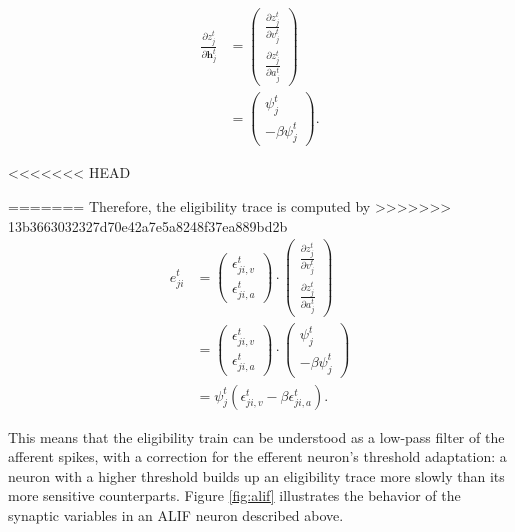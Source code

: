             \begin{align}
                \frac{\partial z^t_j}{\partial\mathbf{h}^t_j} &= \begin{pmatrix}
                    \frac{\partial z^t_j}{\partial v^t_j}\\
                    \frac{\partial z^t_j}{\partial a^t_j}
                    \end{pmatrix}\\
                &= \begin{pmatrix}
                    \psi^t_j\\
                    -\beta\psi^t_j
                    \end{pmatrix}.
            \end{align}

<<<<<<< HEAD

=======
            Therefore, the eligibility trace is computed by
>>>>>>> 13b3663032327d70e42a7e5a8248f37ea889bd2b
            \begin{align}
               e^t_{ji} &= \begin{pmatrix}
            \epsilon_{ji, v}^t\\
            \epsilon_{ji, a}^t
            \end{pmatrix}\cdot \begin{pmatrix}
                    \frac{\partial z^t_j}{\partial v^t_j}\\
                    \frac{\partial z^t_j}{\partial a^t_j}
                    \end{pmatrix}\\
                &= \begin{pmatrix}
            \epsilon_{ji, v}^t\\
            \epsilon_{ji, a}^t
            \end{pmatrix}\cdot \begin{pmatrix}
                    \psi^t_j\\
                    -\beta\psi^t_j
                    \end{pmatrix}\\
                    &= \psi^t_j\left(\epsilon_{ji, v}^t - \beta\epsilon_{ji, a}^t\right).
            \end{align}


            This means that the eligibility train can be understood as a low-pass filter of the afferent spikes, with a correction for the efferent neuron's threshold adaptation: a neuron with a higher threshold builds up an eligibility trace more slowly than its more sensitive counterparts.
            Figure \ref{fig:alif} illustrates the behavior of the synaptic variables in an ALIF neuron described above.

